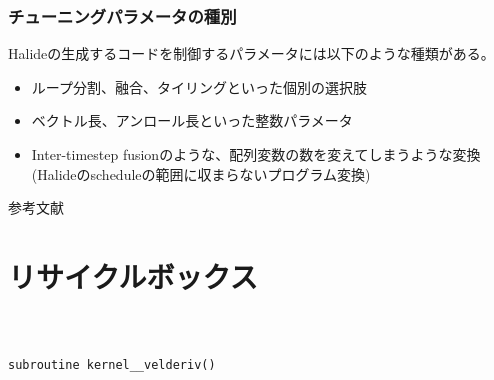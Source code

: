 \documentclass[dvipdfmx,cjk]{beamer}
\begin{document}
\begin{frame}\frametitle{}

\end{frame}

\begin{frame}\frametitle{チューニングパラメータの種別}
  Halideの生成するコードを制御するパラメータには以下のような種類がある。
  \begin{itemize}
  \item  ループ分割、融合、タイリングといった個別の選択肢
  \item  ベクトル長、アンロール長といった整数パラメータ
  \item  Inter-timestep fusionのような、配列変数の数を変えてしまうような変換
    (Halideのscheduleの範囲に収まらないプログラム変換)
  \end{itemize}


\end{frame}




\begin{frame}[allowframebreaks]{参考文献}{}
  
  
\end{frame}



% 
% 
% 








\section*{リサイクルボックス}




\subsection{}
\begin{frame}\frametitle{}
\begin{eqnarray}
\end{eqnarray}
\end{frame}


\begin{frame}[fragile]\frametitle{}
\begingroup
    \fontsize{8pt}{9pt}\selectfont
\begin{verbatim}
subroutine kernel__velderiv()
\end{verbatim}
\endgroup
\vspace{-1cm}
\end{frame}
\end{document}
